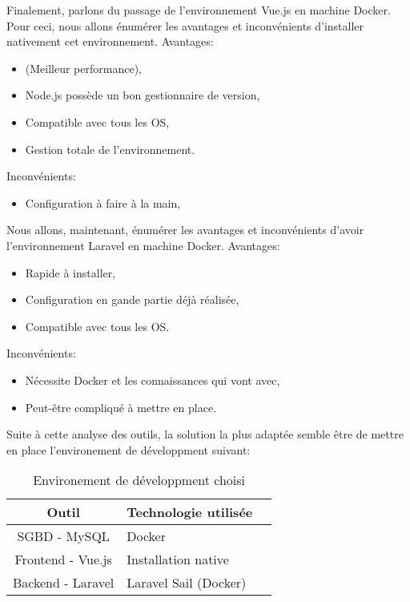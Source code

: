 \documentclass[
    iai, %
    il, %
]{heig-tb}
\begin{document}

Finalement, parlons du passage de l'environnement Vue.js en machine Docker.
Pour ceci, nous allons énumérer les avantages et inconvénients d'installer nativement cet environnement.
Avantages:
\begin{itemize}
    \item (Meilleur performance),
    \item Node.js possède un bon gestionnaire de version,
    \item Compatible avec tous les OS,
    \item Gestion totale de l'environnement.
\end{itemize}

Inconvénients:
\begin{itemize}
    \item Configuration à faire à la main,
\end{itemize}

Nous allons, maintenant, énumérer les avantages et inconvénients d'avoir l'environnement Laravel en machine Docker.
Avantages:
\begin{itemize}
    \item Rapide à installer,
    \item Configuration en gande partie déjà réalisée,
    \item Compatible avec tous les OS.
\end{itemize}

Inconvénients:
\begin{itemize}
    \item Nécessite Docker et les connaissances qui vont avec,
    \item Peut-être compliqué à mettre en place.
\end{itemize}

Suite à cette analyse des outils, la solution la plus adaptée semble être de mettre en place l'environement de développment suivant:

\begin{table}[h]
    \begin{center}
        \caption{Environement de développment choisi \label{env_dev}}
        \begin{tabular}{c|l|r}
            Outil             & Technologie utilisée  \\ \hline
            SGBD - MySQL      & Docker                \\
            Frontend - Vue.js & Installation native   \\
            Backend - Laravel & Laravel Sail (Docker) \\
        \end{tabular}
    \end{center}
\end{table}
\end{document}
